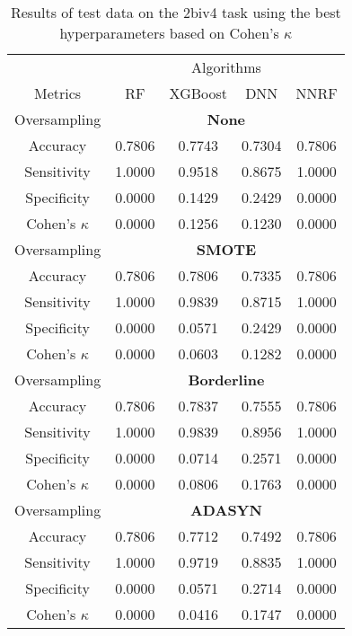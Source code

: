 \begin{table}[!htb]
\centering
\caption{Results of test data on the 2biv4 task using the best hyperparameters based on Cohen's $\kappa$}
\label{tab:2biv4_test_results}
\begin{tabular}{c | c c c c}
\hline
 & \multicolumn{4}{c}{Algorithms}\\ 
Metrics &RF & XGBoost & DNN & NNRF\\ 
\hline
Oversampling &\multicolumn{4}{|c}{\textbf{None}}\\ 
\hline
Accuracy & 0.7806 & 0.7743 & 0.7304 & 0.7806\\ 
Sensitivity & 1.0000 & 0.9518 & 0.8675 & 1.0000\\ 
Specificity & 0.0000 & 0.1429 & 0.2429 & 0.0000\\ 
Cohen's $\kappa$ & 0.0000 & 0.1256 & 0.1230 & 0.0000\\ 
\hline
Oversampling &\multicolumn{4}{|c}{\textbf{SMOTE}}\\ 
\hline
Accuracy & 0.7806 & 0.7806 & 0.7335 & 0.7806\\ 
Sensitivity & 1.0000 & 0.9839 & 0.8715 & 1.0000\\ 
Specificity & 0.0000 & 0.0571 & 0.2429 & 0.0000\\ 
Cohen's $\kappa$ & 0.0000 & 0.0603 & 0.1282 & 0.0000\\ 
\hline
Oversampling &\multicolumn{4}{|c}{\textbf{Borderline}}\\ 
\hline
Accuracy & 0.7806 & 0.7837 & 0.7555 & 0.7806\\ 
Sensitivity & 1.0000 & 0.9839 & 0.8956 & 1.0000\\ 
Specificity & 0.0000 & 0.0714 & 0.2571 & 0.0000\\ 
Cohen's $\kappa$ & 0.0000 & 0.0806 & 0.1763 & 0.0000\\ 
\hline
Oversampling &\multicolumn{4}{|c}{\textbf{ADASYN}}\\ 
\hline
Accuracy & 0.7806 & 0.7712 & 0.7492 & 0.7806\\ 
Sensitivity & 1.0000 & 0.9719 & 0.8835 & 1.0000\\ 
Specificity & 0.0000 & 0.0571 & 0.2714 & 0.0000\\ 
Cohen's $\kappa$ & 0.0000 & 0.0416 & 0.1747 & 0.0000\\ 
\hline
\end{tabular}
\end{table}


